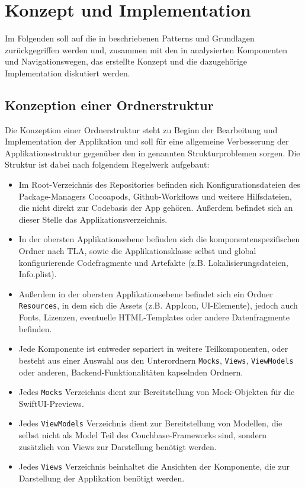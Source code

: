 \chapter{Konzept und Implementation}\label{ch:konzept}

Im Folgenden soll auf die in  beschriebenen Patterns und Grundlagen zurückgegriffen werden und, zusammen mit den in  analysierten Komponenten und Navigationswegen, das erstellte Konzept und die dazugehörige Implementation diskutiert werden.

\section{Konzeption einer Ordnerstruktur}

Die Konzeption einer Ordnerstruktur steht zu Beginn der Bearbeitung und Implementation der Applikation und soll für eine allgemeine Verbesserung der Applikationsstruktur gegenüber den in  genannten Strukturproblemen sorgen. Die Struktur ist dabei nach folgendem Regelwerk aufgebaut:

\begin{itemize}
\item Im Root-Verzeichnis des Repositories befinden sich Konfigurationsdateien des Package-Managers Cocoapods, Github-Workflows und weitere Hilfsdateien, die nicht direkt zur Codebasis der App gehören. Außerdem befindet sich an dieser Stelle das Applikationsverzeichnis.
\item In der obersten Applikationsebene befinden sich die komponentenspezifischen Ordner nach TLA, sowie die Applikationsklasse selbst und global konfigurierende Codefragmente und Artefakte (z.B. Lokalisierungsdateien, Info.plist).
\item Außerdem in der obersten Applikationsebene befindet sich ein Ordner \texttt{Resources}, in dem sich die Assets (z.B. AppIcon, UI-Elemente), jedoch auch Fonts, Lizenzen, eventuelle HTML-Templates oder andere Datenfragmente befinden.
\item Jede Komponente ist entweder separiert in weitere Teilkomponenten, oder besteht aus einer Auswahl aus den Unterordnern \texttt{Mocks}, \texttt{Views}, \texttt{ViewModels} oder anderen, Backend-Funktionalitäten kapselnden Ordnern.
\item Jedes \texttt{Mocks} Verzeichnis dient zur Bereitstellung von Mock-Objekten für die SwiftUI-Previews.
\item Jedes \texttt{ViewModels} Verzeichnis dient zur Bereitstellung von Modellen, die selbst nicht als Model Teil des Couchbase-Frameworks sind, sondern zusätzlich von Views zur Darstellung benötigt werden.
\item Jedes \texttt{Views} Verzeichnis beinhaltet die Ansichten der Komponente, die zur Darstellung der Applikation benötigt werden.
\end{itemize}

